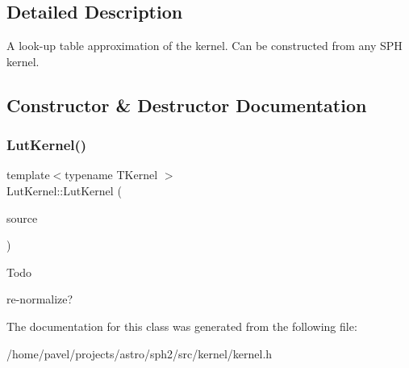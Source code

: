 \subsection{Detailed Description}
A look-\/up table approximation of the kernel. Can be constructed from any S\+PH kernel. 

\subsection{Constructor \& Destructor Documentation}
\hypertarget{classLutKernel_a91a4f8b38a4b859536bcfda2140d1585}{}\label{classLutKernel_a91a4f8b38a4b859536bcfda2140d1585} 
\subsubsection{\texorpdfstring{Lut\+Kernel()}{LutKernel()}}
{\footnotesize\ttfamily template$<$typename T\+Kernel $>$ \\
Lut\+Kernel\+::\+Lut\+Kernel (\begin{DoxyParamCaption}\item[{T\+Kernel \&\&}]{source }\end{DoxyParamCaption})\hspace{0.3cm}{\ttfamily [inline]}}

\begin{DoxyRefDesc}{Todo}
\item[\hyperlink{todo__todo000017}{Todo}]re-\/normalize? \end{DoxyRefDesc}


The documentation for this class was generated from the following file\+:\begin{DoxyCompactItemize}
\item 
/home/pavel/projects/astro/sph2/src/kernel/kernel.\+h\end{DoxyCompactItemize}
